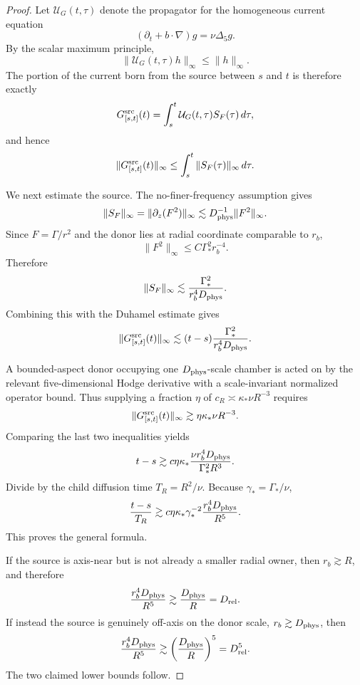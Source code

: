 \documentclass[11pt]{article}
\theoremstyle{definition}\newtheorem{definition}[theorem]{Definition}
\theoremstyle{remark}\newtheorem{remark}[theorem]{Remark}
\begin{document}
\begin{proof}
Let $\mathcal U_G(t,\tau)$ denote the propagator for the homogeneous current
equation
\[
 (\partial_t+b\cdot\nabla)g=\nu\Delta_5g.
\]
By the scalar maximum principle,
\[
 \|\mathcal U_G(t,\tau)h\|_\infty\le\|h\|_\infty.
\]
The portion of the current born from the source between $s$ and $t$ is
therefore exactly
\[
 G^{\rm src}_{[s,t]}(t)
 =\int_s^t\mathcal U_G(t,\tau)S_F(\tau)\,d\tau,
\]
and hence
\[
 \|G^{\rm src}_{[s,t]}(t)\|_\infty
 \le\int_s^t\|S_F(\tau)\|_\infty\,d\tau.
\]

We next estimate the source.  The no-finer-frequency assumption gives
\[
 \|S_F\|_\infty
 =\|\partial_z(F^2)\|_\infty
 \lesssim D_{\rm phys}^{-1}\|F^2\|_\infty.
\]
Since $F=\Gamma/r^2$ and the donor lies at radial coordinate comparable to
$r_b$,
\[
 \|F^2\|_\infty
 \le C\Gamma_*^2r_b^{-4}.
\]
Therefore
\[
 \|S_F\|_\infty
 \lesssim
 \frac{\Gamma_*^2}{r_b^4D_{\rm phys}}.
\]
Combining this with the Duhamel estimate gives
\[
 \|G^{\rm src}_{[s,t]}(t)\|_\infty
 \lesssim
 (t-s)\frac{\Gamma_*^2}{r_b^4D_{\rm phys}}.
\]

A bounded-aspect donor occupying one $D_{\rm phys}$-scale chamber is acted on
by the relevant five-dimensional Hodge derivative with a scale-invariant
normalized operator bound.  Thus supplying a fraction $\eta$ of
$c_R\asymp\kappa_*\nu R^{-3}$ requires
\[
 \|G^{\rm src}_{[s,t]}(t)\|_\infty
 \gtrsim \eta\kappa_*\nu R^{-3}.
\]
Comparing the last two inequalities yields
\[
 t-s
 \gtrsim
 c\eta\kappa_*
 \frac{\nu r_b^4D_{\rm phys}}{\Gamma_*^2R^3}.
\]
Divide by the child diffusion time $T_R=R^2/\nu$.  Because
$\gamma_*=\Gamma_*/\nu$,
\[
 \frac{t-s}{T_R}
 \gtrsim
 c\eta\kappa_*\gamma_*^{-2}
 \frac{r_b^4D_{\rm phys}}{R^5}.
\]
This proves the general formula.

If the source is axis-near but is not already a smaller radial owner, then
$r_b\gtrsim R$, and therefore
\[
 \frac{r_b^4D_{\rm phys}}{R^5}
 \gtrsim\frac{D_{\rm phys}}R
 =D_{\rm rel}.
\]
If instead the source is genuinely off-axis on the donor scale,
$r_b\gtrsim D_{\rm phys}$, then
\[
 \frac{r_b^4D_{\rm phys}}{R^5}
 \gtrsim
 \left(\frac{D_{\rm phys}}R\right)^5
 =D_{\rm rel}^5.
\]
The two claimed lower bounds follow.
\end{proof}
\end{document}
